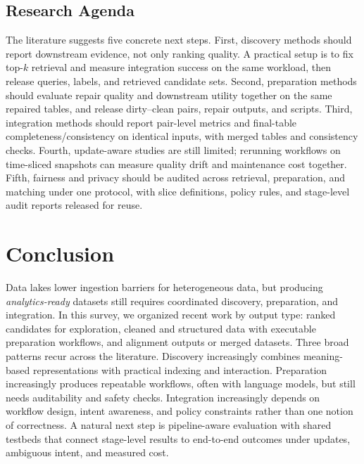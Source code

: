 \documentclass[sigconf,nonacm]{acmart}
\begin{document}
\subsection{Research Agenda}
The literature suggests five concrete next steps. First, discovery methods should report downstream evidence, not only ranking quality. A practical setup is to fix top-$k$ retrieval and measure integration success on the same workload, then release queries, labels, and retrieved candidate sets. Second, preparation methods should evaluate repair quality and downstream utility together on the same repaired tables, and release dirty--clean pairs, repair outputs, and scripts. Third, integration methods should report pair-level metrics and final-table completeness/consistency on identical inputs, with merged tables and consistency checks. Fourth, update-aware studies are still limited; rerunning workflows on time-sliced snapshots can measure quality drift and maintenance cost together. Fifth, fairness and privacy should be audited across retrieval, preparation, and matching under one protocol, with slice definitions, policy rules, and stage-level audit reports released for reuse.

\section{Conclusion}
Data lakes lower ingestion barriers for heterogeneous data, but producing \emph{analytics-ready} datasets still requires coordinated discovery, preparation, and integration. In this survey, we organized recent work by output type: ranked candidates for exploration, cleaned and structured data with executable preparation workflows, and alignment outputs or merged datasets. Three broad patterns recur across the literature. Discovery increasingly combines meaning-based representations with practical indexing and interaction. Preparation increasingly produces repeatable workflows, often with language models, but still needs auditability and safety checks. Integration increasingly depends on workflow design, intent awareness, and policy constraints rather than one notion of correctness. A natural next step is pipeline-aware evaluation with shared testbeds that connect stage-level results to end-to-end outcomes under updates, ambiguous intent, and measured cost.


\balance


\end{document}
